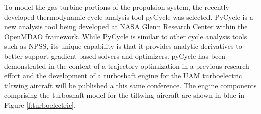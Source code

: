 To model the gas turbine portions of the propulsion system, the recently developed thermodynamic cycle analysis tool pyCycle was selected.\cite{gray2017chemical,hearn2016optimization}
PyCycle is a new analysis tool being developed at NASA Glenn Research Center within the OpenMDAO framework.
While PyCycle is similar to other cycle analysis tools such as NPSS, its unique capability is that it provides analytic derivatives to better support gradient based solvers and optimizers.  
pyCycle has been demonstrated in the context of a trajectory optimization in a previous research effort\cite{hendricks2017simultaneous} and the development of a turboshaft engine for the UAM turboelectric tiltwing aircraft will be published a this same conference.\cite{chapman2018multi}
The engine components comprising the turboshaft model for the tiltwing aircraft are shown in blue in Figure \ref{f:turboelectric}.


